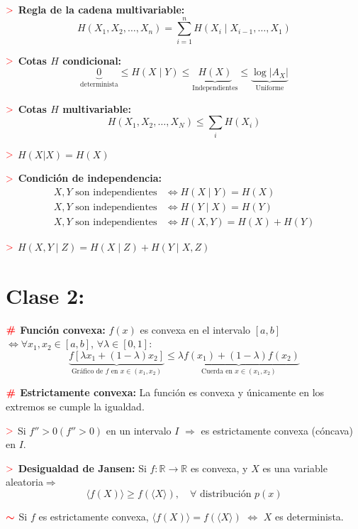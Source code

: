 \documentclass[%
 reprint,
 amsmath,amssymb,
 aps,
]{revtex4-1}
\begin{document}
\textbf{$\textcolor{red}{\mathbf{>}}$ Regla de la cadena multivariable: }
$$
H\left(X_{1}, X_{2}, \ldots, X_{n}\right)=\sum_{i=1}^{n} H\left(X_{i} \mid X_{i-1}, \ldots, X_{1}\right)
$$


\textbf{$\textcolor{red}{\mathbf{>}}$ Cotas $H$ condicional:}
$$
\underbrace{0}_{\text{determinista}} \leq H(X \mid Y) \leq \underbrace{H(X)}_{\text{Independientes}}
\leq \underbrace{\log|A_X|}_{\text{Uniforme}}
$$

\textbf{$\textcolor{red}{\mathbf{>}}$ Cotas $H$ multivariable:}
$$
H\left(X_{1}, X_{2}, \ldots, X_{N}\right) \leq \sum_{i} H\left(X_{i}\right)
$$

\textbf{$\textcolor{red}{\mathbf{>}}$} $H(X|X) = H(X)$

\textbf{$\textcolor{red}{\mathbf{>}}$ Condición de independencia:} 
$$
\begin{aligned}
  X, Y \text{ son independientes} & \Leftrightarrow H(X \mid Y)=H(X) \\
  X, Y \text{ son independientes} & \Leftrightarrow H(Y \mid X)=H(Y) \\
  X, Y \text{ son independientes} & \Leftrightarrow H(X, Y) = H(X)+H(Y)
\end{aligned}
$$

\textbf{$\textcolor{red}{\mathbf{>}}$} 
$H(X, Y \mid Z)=H(X \mid Z) + H(Y \mid X,Z)$

\section{Clase 2:}

\textbf{$\color{red}{\textbf{\#}}$ Función convexa:} 
$f(x)$ es convexa en el intervalo $[a, b]$ $\Leftrightarrow \forall x_{1}, x_{2} \in [a, b]$, $\forall \lambda \in[0,1]$:
$$
\underbrace{f\left[\lambda x_{1}+(1-\lambda) x_{2}\right]}_{\text {Gráfico de $f$ en } x \in (x_1,x_2)} \leq \underbrace{\lambda f\left(x_{1}\right)+(1-\lambda) f\left(x_{2}\right)}_{\text {Cuerda en } x \in (x_1,x_2)}
$$

\textbf{$\color{red}{\textbf{\#}}$ Estrictamente convexa:} 
La función es convexa y únicamente en los extremos se cumple la igualdad.

\textbf{$\textcolor{red}{\mathbf{>}}$} Si $f''>0(f''>0)$ en un intervalo $I$ $\Rightarrow$ es estrictamente convexa (cóncava) en $I$.

\textbf{$\textcolor{red}{\mathbf{>}}$ Desigualdad de Jansen:} 
Si $f: \mathbb{R} \rightarrow \mathbb{R}$ es convexa, y $X$ es una variable aleatoria$\Rightarrow$
$$
\langle f(X)\rangle \geq f(\langle X\rangle), \quad
\forall \text{ distribución } p(x)
$$

\textbf{$\textcolor{red}{\color{red}{\boldsymbol{\sim}}}$} 
Si $f$ es estrictamente convexa, $\langle f(X)\rangle = f(\langle X\rangle)$
$\Leftrightarrow$ $X$ es determinista.
\end{document}
